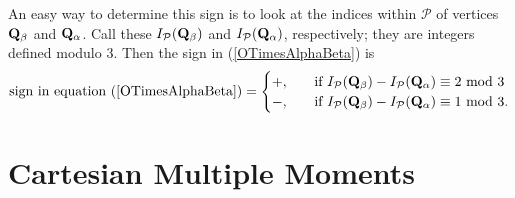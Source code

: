 \documentclass[letterpaper]{article}
\begin{document}
An easy way to determine this sign is to look at the 
indices within $\mathcal{P}$ of vertices $\mathbf{Q}_\beta$
and $\mathbf{Q}_\alpha$. Call these $I_{\mathcal{P}}(\mathbf{Q}_\beta)$ and 
$I_{\mathcal{P}}(\mathbf{Q}_\alpha)$, respectively; they are integers
defined modulo 3. Then the sign in (\ref{OTimesAlphaBeta})
is 
$$ \text{sign in equation (\ref{OTimesAlphaBeta})} 
   = 
   \begin{cases}
   +, \quad &\text{if } I_{\mathcal{P}}(\mathbf{Q}_\beta)
                       -I_{\mathcal{P}}(\mathbf{Q}_\alpha)
                        \equiv 2 \text{ mod } 3 
   \\
   -, \quad &\text{if } I_{\mathcal{P}}(\mathbf{Q}_\beta)
                       -I_{\mathcal{P}}(\mathbf{Q}_\alpha)
                        \equiv 1 \text{ mod } 3.
   \end{cases}
$$

\newpage
\section{Cartesian Multiple Moments}
\end{document}
